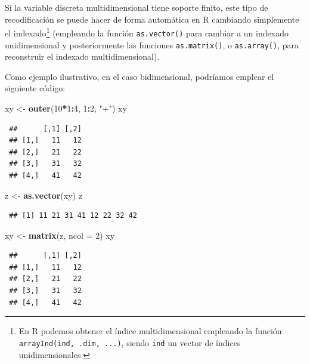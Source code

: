 \documentclass[
  spanish,
  10pt,
]{book}
\newenvironment{Shaded}{\begin{snugshade}}{\end{snugshade}}
\newcommand{\AttributeTok}[1]{\textcolor[rgb]{0.13,0.29,0.53}{#1}}
\newcommand{\DecValTok}[1]{\textcolor[rgb]{0.00,0.00,0.81}{#1}}
\newcommand{\FunctionTok}[1]{\textcolor[rgb]{0.13,0.29,0.53}{\textbf{#1}}}
\newcommand{\NormalTok}[1]{#1}
\newcommand{\OtherTok}[1]{\textcolor[rgb]{0.56,0.35,0.01}{#1}}
\newcommand{\SpecialCharTok}[1]{\textcolor[rgb]{0.81,0.36,0.00}{\textbf{#1}}}
\newcommand{\StringTok}[1]{\textcolor[rgb]{0.31,0.60,0.02}{#1}}
\theoremstyle{break}
\theoremstyle{nonumberplain}
\let\oldfootnote\footnote
\renewcommand\footnote[1]{\oldfootnote{\hspace{2mm}#1}}
\begin{document}
Si la variable discreta multidimensional tiene soporte finito, este tipo de recodificación se puede hacer de forma automática en R cambiando simplemente el indexado\footnote{En R podemos obtener el índice multidimensional empleando la función \texttt{arrayInd(ind,\ .dim,\ ...)}, siendo \texttt{ind} un vector de índices unidimensionales.} (empleando la función \texttt{as.vector()} para cambiar a un indexado unidimensional y posteriormente las funciones \texttt{as.matrix()}, o \texttt{as.array()}, para reconstruir el indexado multidimensional).

Como ejemplo ilustrativo, en el caso bidimensional, podríamos emplear el siguiente código:

\begin{Shaded}
\begin{Highlighting}[]
\NormalTok{xy }\OtherTok{\textless{}{-}} \FunctionTok{outer}\NormalTok{(}\DecValTok{10}\SpecialCharTok{*}\DecValTok{1}\SpecialCharTok{:}\DecValTok{4}\NormalTok{, }\DecValTok{1}\SpecialCharTok{:}\DecValTok{2}\NormalTok{, }\StringTok{"+"}\NormalTok{)}
\NormalTok{xy}
\end{Highlighting}
\end{Shaded}

\begin{verbatim}
 ##      [,1] [,2]
 ## [1,]   11   12
 ## [2,]   21   22
 ## [3,]   31   32
 ## [4,]   41   42
\end{verbatim}

\begin{Shaded}
\begin{Highlighting}[]
\NormalTok{z }\OtherTok{\textless{}{-}} \FunctionTok{as.vector}\NormalTok{(xy)}
\NormalTok{z}
\end{Highlighting}
\end{Shaded}

\begin{verbatim}
 ## [1] 11 21 31 41 12 22 32 42
\end{verbatim}

\begin{Shaded}
\begin{Highlighting}[]
\NormalTok{xy }\OtherTok{\textless{}{-}} \FunctionTok{matrix}\NormalTok{(z, }\AttributeTok{ncol =} \DecValTok{2}\NormalTok{)}
\NormalTok{xy}
\end{Highlighting}
\end{Shaded}

\begin{verbatim}
 ##      [,1] [,2]
 ## [1,]   11   12
 ## [2,]   21   22
 ## [3,]   31   32
 ## [4,]   41   42
\end{verbatim}
\end{document}
